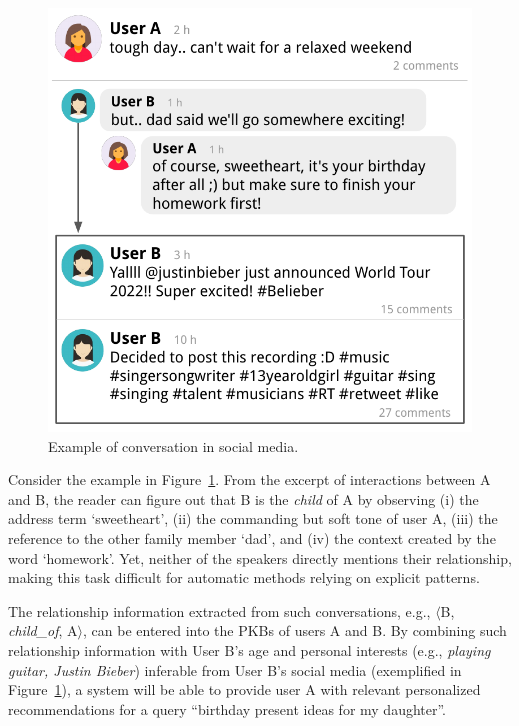 \begin{figure}[t!]
\centering
\begin{adjustbox}{width=0.46\textwidth}
\includegraphics{imgs/conversation_example}
\end{adjustbox}
\caption{Example of 
conversation in social media.}
\label{example_conv}
\end{figure}

Consider the example in Figure~\ref{example_conv}.
From the excerpt of interactions between A and B, the reader can figure out that B is the \textit{child} of A by observing (i) the address term `sweetheart', (ii) the commanding but soft tone of user A, (iii) the reference to the other family member `dad', and (iv) the context created by the word `homework'. Yet, neither of the speakers directly mentions their relationship, making this task difficult for automatic methods 
relying on explicit patterns.

The relationship information extracted from such conversations, e.g., $\langle$B, \emph{child\_of}, A$\rangle$, can be entered into the PKBs of users A and B. By combining such relationship information with User B's age and personal interests (e.g., \emph{playing guitar, Justin Bieber}) inferable from User B's social media (exemplified in Figure~\ref{example_conv}), 
a system will be able to provide
user A with relevant personalized recommendations for a query ``birthday present ideas for my daughter''. 

